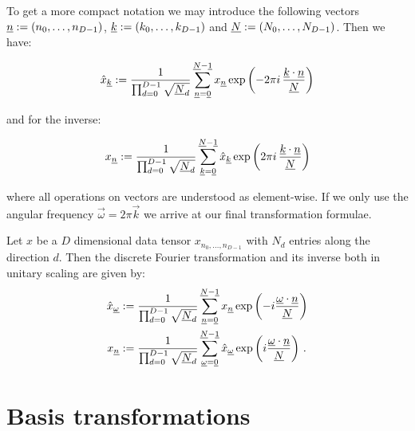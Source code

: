 To get a more compact notation we may introduce the following vectors
$\underline{n} := (n_0, \ldots, n_{D-1})$, $\underline{k} := (k_0, \ldots, k_{D-1})$
and $\underline{N} := (N_0, \ldots, N_{D-1})$. Then we have:

\begin{equation*}
  \hat{x}_{\underline{k}} := \frac{1}{\prod_{d=0}^{D-1} \sqrt{\underline{N}_d}}
                            \sum_{\underline{n} = \underline{0}}^{\underline{N} - \underline{1}}
                            x_{\underline{n}} \exp\left( -2 \pi i \, \frac{\underline{k} \cdot \underline{n}}{\underline{N}} \right)
\end{equation*}

and for the inverse:

\begin{equation*}
  x_{\underline{n}} := \frac{1}{\prod_{d=0}^{D-1} \sqrt{\underline{N}_d}}
                      \sum_{\underline{k} = \underline{0}}^{\underline{N} - \underline{1}}
                      \hat{x}_{\underline{k}} \exp\left( 2 \pi i \, \frac{\underline{k} \cdot \underline{n}}{\underline{N}} \right)
\end{equation*}

where all operations on vectors are understood as element-wise. If we only use the
angular frequency $\vec{\omega} = 2\pi \vec{k}$ we arrive at our final transformation
formulae.

\begin{definition}
  Let $x$ be a $D$ dimensional data tensor $x_{n_0, \ldots, n_{D-1}}$
  with $N_d$ entries along the direction $d$. Then the discrete
  Fourier transformation and its inverse both in unitary scaling are given by:
  \begin{align*}
  \hat{x}_{\underline{\omega}}
  & := \frac{1}{\prod_{d=0}^{D-1} \sqrt{\underline{N}_d}}
            \sum_{\underline{n} = \underline{0}}^{\underline{N} - \underline{1}}
            x_{\underline{n}} \exp\left( -i \frac{\underline{\omega} \cdot \underline{n}}{\underline{N}} \right) \\
  x_{\underline{n}}
  & := \frac{1}{\prod_{d=0}^{D-1} \sqrt{\underline{N}_d}}
            \sum_{\underline{\omega} = \underline{0}}^{\underline{N} - \underline{1}}
            \hat{x}_{\underline{\omega}} \exp\left( i \frac{\underline{\omega} \cdot \underline{n}}{\underline{N}} \right) \,.
  \end{align*}
\end{definition}


\section{Basis transformations}


